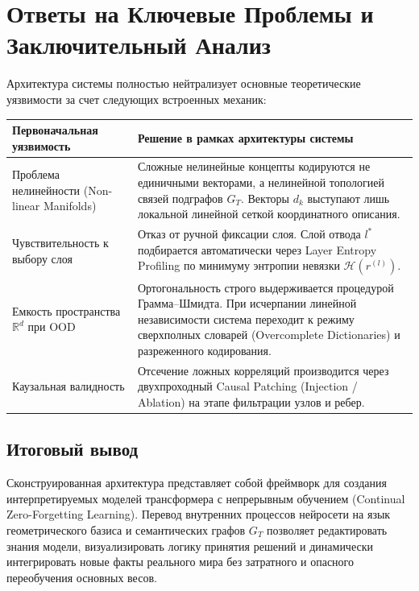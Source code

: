 \documentclass[11pt,a4paper]{article}
\begin{document}
\normalsize
\section{Ответы на Ключевые Проблемы и Заключительный Анализ}

Архитектура системы полностью нейтрализует основные теоретические уязвимости за счет следующих встроенных механик:

\begin{table}[ht]
\centering
\small
\renewcommand{\arraystretch}{1.25}
\begin{tabular}{>{\raggedright\arraybackslash}p{} >{\raggedright\arraybackslash}p{}}
\toprule
\textbf{Первоначальная уязвимость} & \textbf{Решение в рамках архитектуры системы} \\
\midrule
Проблема нелинейности (Non-linear Manifolds) & Сложные нелинейные концепты кодируются не единичными векторами, а нелинейной топологией связей подграфов $G_T$. Векторы $d_k$ выступают лишь локальной линейной сеткой координатного описания. \\
\addlinespace
Чувствительность к выбору слоя & Отказ от ручной фиксации слоя. Слой отвода $l^*$ подбирается автоматически через Layer Entropy Profiling по минимуму энтропии невязки $\mathcal{H}(r^{(l)})$. \\
\addlinespace
Емкость пространства $\mathbb{R}^d$ при OOD & Ортогональность строго выдерживается процедурой Грамма--Шмидта. При исчерпании линейной независимости система переходит к режиму сверхполных словарей (Overcomplete Dictionaries) и разреженного кодирования. \\
\addlinespace
Каузальная валидность & Отсечение ложных корреляций производится через двухпроходный Causal Patching (Injection / Ablation) на этапе фильтрации узлов и ребер. \\
\bottomrule
\end{tabular}
\end{table}

\subsection*{Итоговый вывод}

Сконструированная архитектура представляет собой фреймворк для создания интерпретируемых моделей трансформера с непрерывным обучением (Continual Zero-Forgetting Learning). Перевод внутренних процессов нейросети на язык геометрического базиса и семантических графов $G_T$ позволяет редактировать знания модели, визуализировать логику принятия решений и динамически интегрировать новые факты реального мира без затратного и опасного переобучения основных весов.
\end{document}
